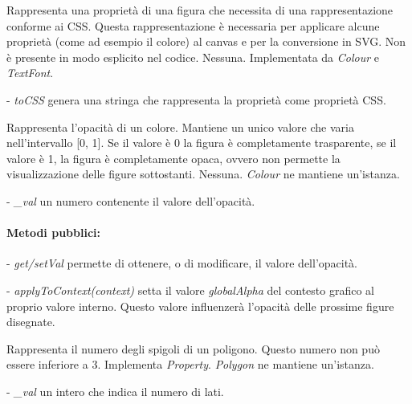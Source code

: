 Rappresenta una propriet\`a di una figura che necessita di una rappresentazione conforme ai CSS. Questa rappresentazione \`e necessaria per applicare alcune propriet\`a (come ad esempio il colore) al canvas e per la conversione in SVG. Non \`e presente in modo esplicito nel codice.
Nessuna.
Implementata da \textit{Colour} e \textit{TextFont}. 
\begin{elencopuntato}[\subsubsecindent]
\item[-] \textit{toCSS} genera una stringa che rappresenta la propriet\`a come propriet\`a CSS.
\end{elencopuntato}

Rappresenta l'opacit\`a di un colore. Mantiene un unico valore che varia nell'intervallo [0, 1]. Se il valore \`e 0 la figura \`e completamente trasparente, se
il valore \`e 1, la figura \`e completamente opaca, ovvero non permette la visualizzazione delle figure sottostanti.
Nessuna.
\textit{Colour} ne mantiene un'istanza.
\begin{elencopuntato}[\subsubsecindent]
\item[-] \textit{\_val} un numero contenente il valore dell'opacit\`a.
\end{elencopuntato}
\paragraph{Metodi pubblici:}
\begin{elencopuntato}[\subsubsecindent]
\item[-] \textit{get/setVal} permette di ottenere, o di modificare, il valore dell'opacit\`a.
\item[-] \textit{applyToContext(context)} setta il valore \textit{globalAlpha} del contesto grafico al proprio valore interno. Questo valore influenzer\`a l'opacit\`a delle prossime figure disegnate.
\end{elencopuntato}

Rappresenta il numero degli spigoli di un poligono. Questo numero non pu\`o essere inferiore a 3.
Implementa \textit{Property}.
\textit{Polygon} ne mantiene un'istanza.
\begin{elencopuntato}[\subsubsecindent]
\item[-] \textit{\_val} un intero che indica il numero di lati.
\end{elencopuntato}
